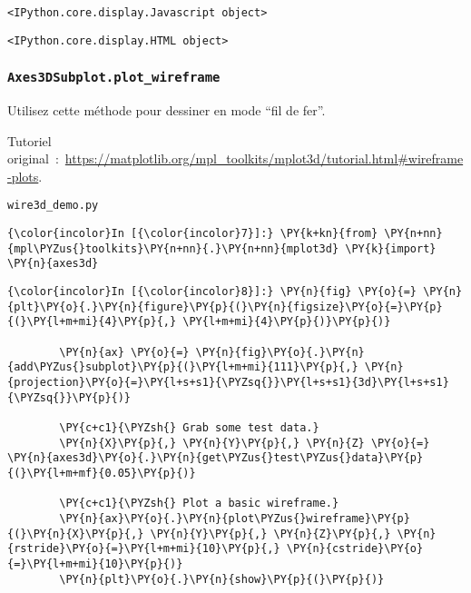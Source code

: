     
    \begin{verbatim}
<IPython.core.display.Javascript object>
    \end{verbatim}

    
    
    \begin{verbatim}
<IPython.core.display.HTML object>
    \end{verbatim}

    
    \hypertarget{axes3dsubplot.plot_wireframe}{%
\subsubsection{\texorpdfstring{\texttt{Axes3DSubplot.plot\_wireframe}}{Axes3DSubplot.plot\_wireframe}}\label{axes3dsubplot.plot_wireframe}}

    Utilisez cette méthode pour dessiner en mode ``fil de fer''.

    Tutoriel
original~:~\url{https://matplotlib.org/mpl_toolkits/mplot3d/tutorial.html\#wireframe-plots}.

    \texttt{wire3d\_demo.py}

    \begin{Verbatim}[commandchars=\\\{\}]
{\color{incolor}In [{\color{incolor}7}]:} \PY{k+kn}{from} \PY{n+nn}{mpl\PYZus{}toolkits}\PY{n+nn}{.}\PY{n+nn}{mplot3d} \PY{k}{import} \PY{n}{axes3d}
\end{Verbatim}


    \begin{Verbatim}[commandchars=\\\{\}]
{\color{incolor}In [{\color{incolor}8}]:} \PY{n}{fig} \PY{o}{=} \PY{n}{plt}\PY{o}{.}\PY{n}{figure}\PY{p}{(}\PY{n}{figsize}\PY{o}{=}\PY{p}{(}\PY{l+m+mi}{4}\PY{p}{,} \PY{l+m+mi}{4}\PY{p}{)}\PY{p}{)}
        
        \PY{n}{ax} \PY{o}{=} \PY{n}{fig}\PY{o}{.}\PY{n}{add\PYZus{}subplot}\PY{p}{(}\PY{l+m+mi}{111}\PY{p}{,} \PY{n}{projection}\PY{o}{=}\PY{l+s+s1}{\PYZsq{}}\PY{l+s+s1}{3d}\PY{l+s+s1}{\PYZsq{}}\PY{p}{)}
        
        \PY{c+c1}{\PYZsh{} Grab some test data.}
        \PY{n}{X}\PY{p}{,} \PY{n}{Y}\PY{p}{,} \PY{n}{Z} \PY{o}{=} \PY{n}{axes3d}\PY{o}{.}\PY{n}{get\PYZus{}test\PYZus{}data}\PY{p}{(}\PY{l+m+mf}{0.05}\PY{p}{)}
        
        \PY{c+c1}{\PYZsh{} Plot a basic wireframe.}
        \PY{n}{ax}\PY{o}{.}\PY{n}{plot\PYZus{}wireframe}\PY{p}{(}\PY{n}{X}\PY{p}{,} \PY{n}{Y}\PY{p}{,} \PY{n}{Z}\PY{p}{,} \PY{n}{rstride}\PY{o}{=}\PY{l+m+mi}{10}\PY{p}{,} \PY{n}{cstride}\PY{o}{=}\PY{l+m+mi}{10}\PY{p}{)}
        \PY{n}{plt}\PY{o}{.}\PY{n}{show}\PY{p}{(}\PY{p}{)}
\end{Verbatim}


